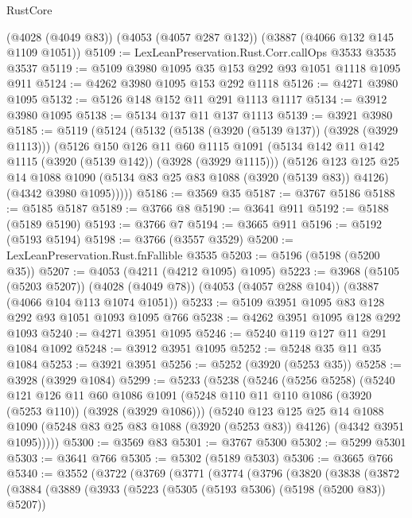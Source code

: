 \begin{lexlean}{RustCore}
\begin{coremodule}
    (@4028 (@4049 @83))
    (@4053 (@4057 @287 @132))
    (@3887 (@4066 @132 @145 @1109 @1051))
@5109 := LexLeanPreservation.Rust.Corr.callOps @3533 @3535 @3537
@5119 := @5109 @3980 @1095 @35 @153 @292 @93 @1051 @1118 @1095 @911
@5124 := @4262 @3980 @1095 @153 @292 @1118
@5126 := @4271 @3980 @1095
@5132 := @5126 @148 @152 @11 @291 @1113 @1117
@5134 := @3912 @3980 @1095
@5138 := @5134 @137 @11 @137 @1113
@5139 := @3921 @3980
@5185 := @5119
    (@5124
      (@5132
        (@5138 (@3920 (@5139 @137)) (@3928 (@3929 @1113)))
        (@5126
          @150
          @126
          @11
          @60
          @1115
          @1091
          (@5134 @142 @11 @142 @1115 (@3920 (@5139 @142)) (@3928 (@3929 @1115)))
          (@5126
            @123
            @125
            @25
            @14
            @1088
            @1090
            (@5134 @83 @25 @83 @1088 (@3920 (@5139 @83)) @4126)
            (@4342 @3980 @1095)))))
@5186 := @3569 @35
@5187 := @3767 @5186
@5188 := @5185 @5187
@5189 := @3766 @8
@5190 := @3641 @911
@5192 := @5188 (@5189 @5190)
@5193 := @3766 @7
@5194 := @3665 @911
@5196 := @5192 (@5193 @5194)
@5198 := @3766 (@3557 @3529)
@5200 := LexLeanPreservation.Rust.fnFallible @3535
@5203 := @5196 (@5198 (@5200 @35))
@5207 := @4053 (@4211 (@4212 @1095) @1095)
@5223 := @3968
    (@5105 (@5203 @5207))
    (@4028 (@4049 @78))
    (@4053 (@4057 @288 @104))
    (@3887 (@4066 @104 @113 @1074 @1051))
@5233 := @5109 @3951 @1095 @83 @128 @292 @93 @1051 @1093 @1095 @766
@5238 := @4262 @3951 @1095 @128 @292 @1093
@5240 := @4271 @3951 @1095
@5246 := @5240 @119 @127 @11 @291 @1084 @1092
@5248 := @3912 @3951 @1095
@5252 := @5248 @35 @11 @35 @1084
@5253 := @3921 @3951
@5256 := @5252 (@3920 (@5253 @35))
@5258 := @3928 (@3929 @1084)
@5299 := @5233
    (@5238
      (@5246
        (@5256 @5258)
        (@5240
          @121
          @126
          @11
          @60
          @1086
          @1091
          (@5248 @110 @11 @110 @1086 (@3920 (@5253 @110)) (@3928 (@3929 @1086)))
          (@5240
            @123
            @125
            @25
            @14
            @1088
            @1090
            (@5248 @83 @25 @83 @1088 (@3920 (@5253 @83)) @4126)
            (@4342 @3951 @1095)))))
@5300 := @3569 @83
@5301 := @3767 @5300
@5302 := @5299 @5301
@5303 := @3641 @766
@5305 := @5302 (@5189 @5303)
@5306 := @3665 @766
@5340 := @3552
    (@3722
      (@3769
        (@3771
          (@3774
            (@3796
              (@3820
                (@3838
                  (@3872
                    (@3884
                      (@3889
                        (@3933
                          (@5223 (@5305 (@5193 @5306) (@5198 (@5200 @83)) @5207))

\end{coremodule}
\end{lexlean}
